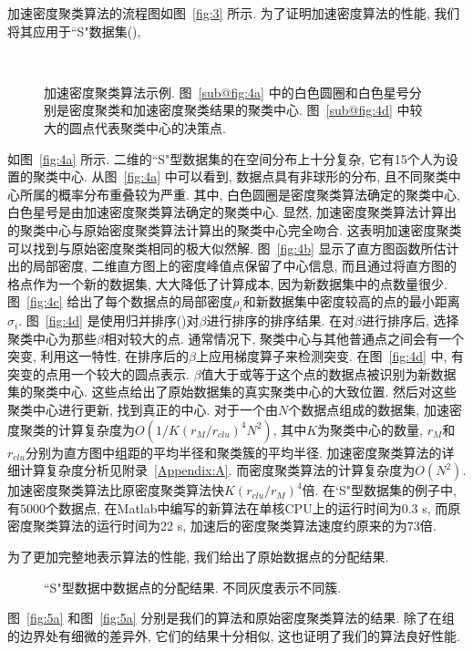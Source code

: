 加速密度聚类算法的流程图如图~\ref{fig:3} 所示. 为了证明加速密度算法的性能, 我们将其应用于``S"数据集(\cite{Fraenti2006}), 
\begin{figure}[htb]
    \centering
    \\
    \caption{加速密度聚类算法示例. 图~\ref{sub@fig:4a} 中的白色圆圈和白色星号分别是密度聚类和加速密度聚类结果的聚类中心. 图~\ref{sub@fig:4d} 中较大的圆点代表聚类中心的决策点. }
\end{figure}
如图~\ref{fig:4a} 所示. 二维的``S"型数据集的在空间分布上十分复杂, 它有15个人为设置的聚类中心. 从图~\ref{fig:4a} 中可以看到, 数据点具有非球形的分布, 且不同聚类中心所属的概率分布重叠较为严重. 其中, 白色圆圈是密度聚类算法确定的聚类中心, 白色星号是由加速密度聚类算法确定的聚类中心. 显然, 加速密度聚类算法计算出的聚类中心与原始密度聚类算法计算出的聚类中心完全吻合. 这表明加速密度聚类可以找到与原始密度聚类相同的极大似然解. 图~\ref{fig:4b} 显示了直方图函数所估计出的局部密度, 二维直方图上的密度峰值点保留了中心信息,  而且通过将直方图的格点作为一个新的数据集, 大大降低了计算成本, 因为新数据集中的点数量很少. 图~\ref{fig:4c} 给出了每个数据点的局部密度$\rho_i$和新数据集中密度较高的点的最小距离$\sigma_i$. 图~\ref{fig:4d} 是使用归并排序(\cite{Satish2010})对$\beta$进行排序的排序结果. 在对$\beta$进行排序后, 选择聚类中心为那些$\beta$相对较大的点. 通常情况下, 聚类中心与其他普通点之间会有一个突变, 利用这一特性, 在排序后的$\beta$上应用梯度算子来检测突变. 在图~\ref{fig:4d} 中, 有突变的点用一个较大的圆点表示. $\beta$值大于或等于这个点的数据点被识别为新数据集的聚类中心. 这些点给出了原始数据集的真实聚类中心的大致位置. 然后对这些聚类中心进行更新, 找到真正的中心. 对于一个由$N$个数据点组成的数据集, 加速密度聚类的计算复杂度为$O(1/K(r_M/r_{clu})^4N^2)$, 其中$K$为聚类中心的数量, $r_M$和$r_{clu}$分别为直方图中组距的平均半径和聚类簇的平均半径. 加速密度聚类算法的详细计算复杂度分析见附录~\ref{Appendix:A}. 而密度聚类算法的计算复杂度为$O(N^2)$. 加速密度聚类算法比原密度聚类算法快$K(r_{clu}/r_M)^4$倍. 在`S"型数据集的例子中, 有$5000$个数据点, 在Matlab中编写的新算法在单核CPU上的运行时间为0.3 s, 而原密度聚类算法的运行时间为22 s, 加速后的密度聚类算法速度约原来的为73倍. 

为了更加完整地表示算法的性能, 我们给出了原始数据点的分配结果. 
\begin{figure}[htb]
    \centering
    \caption{``S"型数据中数据点的分配结果. 不同灰度表示不同簇. \label{fig:5}}
\end{figure}
图~\ref{fig:5a} 和图~\ref{fig:5a} 分别是我们的算法和原始密度聚类算法的结果. 除了在组的边界处有细微的差异外, 它们的结果十分相似, 这也证明了我们的算法良好性能. 

